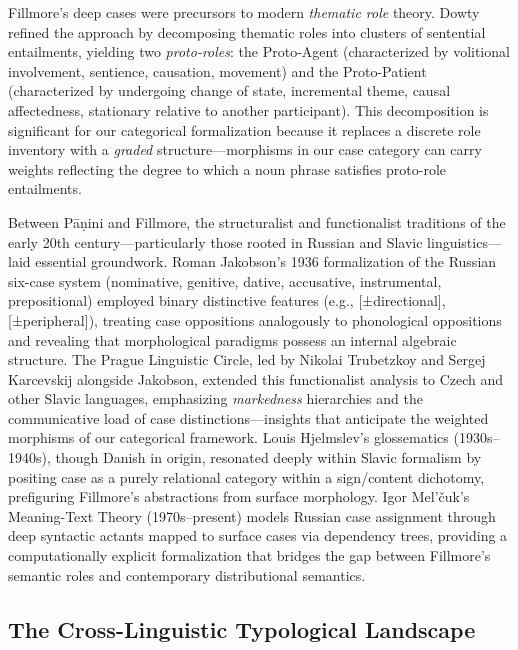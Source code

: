 \documentclass[
]{article}
\numberwithin{equation}{section}
\begin{document}
Fillmore's deep cases were precursors to modern \emph{thematic role}
theory. Dowty \citeyearpar{dowty1991thematic} refined the approach by
decomposing thematic roles into clusters of sentential entailments,
yielding two \emph{proto-roles}: the Proto-Agent (characterized by
volitional involvement, sentience, causation, movement) and the
Proto-Patient (characterized by undergoing change of state, incremental
theme, causal affectedness, stationary relative to another participant).
This decomposition is significant for our categorical formalization
because it replaces a discrete role inventory with a \emph{graded}
structure---morphisms in our case category can carry weights reflecting
the degree to which a noun phrase satisfies proto-role entailments.

Between Pāṇini and Fillmore, the structuralist and functionalist
traditions of the early 20th century---particularly those rooted in
Russian and Slavic linguistics---laid essential groundwork. Roman
Jakobson's 1936 formalization of the Russian six-case system
(nominative, genitive, dative, accusative, instrumental, prepositional)
employed binary distinctive features (e.g., {[}±directional{]},
{[}±peripheral{]}), treating case oppositions analogously to
phonological oppositions and revealing that morphological paradigms
possess an internal algebraic structure. The Prague Linguistic Circle,
led by Nikolai Trubetzkoy and Sergej Karcevskij alongside Jakobson,
extended this functionalist analysis to Czech and other Slavic
languages, emphasizing \emph{markedness} hierarchies and the
communicative load of case distinctions---insights that anticipate the
weighted morphisms of our categorical framework. Louis Hjelmslev's
glossematics (1930s--1940s), though Danish in origin, resonated deeply
within Slavic formalism by positing case as a purely relational category
within a sign/content dichotomy, prefiguring Fillmore's abstractions
from surface morphology. Igor Mel'čuk's Meaning-Text Theory
(1970s--present) models Russian case assignment through deep syntactic
actants mapped to surface cases via dependency trees, providing a
computationally explicit formalization that bridges the gap between
Fillmore's semantic roles and contemporary distributional semantics.

\subsection{The Cross-Linguistic Typological
Landscape}\label{the-cross-linguistic-typological-landscape}
\end{document}
